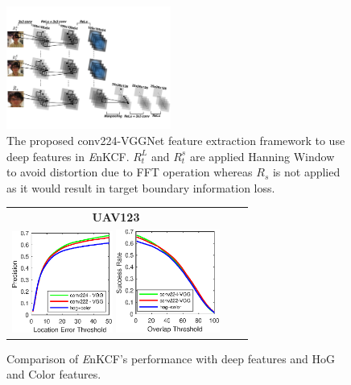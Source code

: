 \documentclass[10pt,twocolumn,letterpaper]{article}
\begin{document}
\begin{figure}[!h]
\centering
\includegraphics[width=0.48\textwidth]{./figures/Filters_Details_CNN.pdf}
\caption{The proposed conv224-VGGNet feature extraction framework to use deep features in {\it E}nKCF. $R_{t}^{L}$ and $R_{t}^{s}$ are applied Hanning Window
to avoid distortion due to FFT operation whereas $R_{s}$ is not applied as it would result in target boundary information loss.}
\label{fig:Filters_CNN}
\end{figure}

\begin{figure}[t]
\centering
\begin{tabular}{ccc}
\tiny\quad\quad\textbf{UAV123}\\
\includegraphics[width=3.30cm]{./figures/pr_deep.eps}
\includegraphics[width=3.40cm]{./figures/sr_deep.eps}\\
\end{tabular}
\caption{Comparison of {\it E}nKCF's performance with deep features and HoG and Color features.}
\label{fig:UAV123_DATASET_DeepFeatures}
\end{figure}

\end{document}
